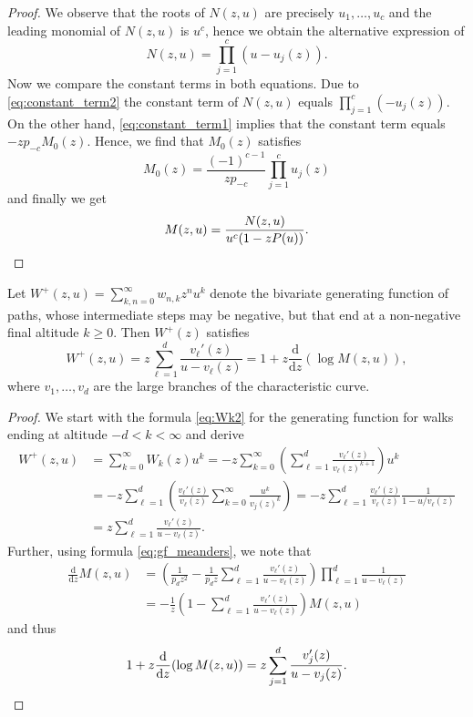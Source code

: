 \begin{proof}
  We observe that the roots of $N(z,u)$ are precisely $u_1,\dots,u_c$ and the leading monomial of $N(z,u)$ is $u^c$, hence we obtain the alternative expression of
  \begin{equation}
    \label{eq:constant_term2}
    N(z,u) =  \prod_{j=1}^c (u - u_j(z)).
  \end{equation}
  Now we compare the constant terms in both equations. 
  Due to \eqref{eq:constant_term2} the constant term of $N(z,u)$ equals $\prod_{j=1}^c (-u_j(z))$. 
  On the other hand, \eqref{eq:constant_term1} implies that the constant term equals $-zp_{-c}M_0(z)$.
  Hence, we find that $M_0(z)$ satisfies 
  $$
    M_0(z) = \frac{(-1)^{c-1}}{zp_{-c}}\prod_{j=1}^cu_j(z)
  $$
  and finally we get
  \begin{equation*}
    M(z,u) = \frac{N(z,u)}{u^c(1 - zP(u))}. \qedhere
  \end{equation*}
\end{proof}

\begin{corollary}
  Let $W^+(z,u) = \sum_{k,n = 0}^\infty w_{n,k} z^n u^k$ denote the bivariate generating function of paths, whose intermediate steps may be negative, but that end at a non-negative final altitude $k \geq 0$. Then $W^+(z)$ satisfies
  $$
    W^+(z,u) = z \sum_{\ell = 1}^d \frac{v_\ell'(z)}{u - v_\ell(z)}
    = 1 + z \frac{\mathrm{d}}{\mathrm{d}z}(\log M(z,u)),
  $$
  where $v_1, \dots, v_d$ are the large branches of the characteristic curve.
\end{corollary}

\begin{proof}
  We start with the formula \eqref{eq:Wk2} for the generating function for walks ending at altitude $-d < k < \infty$ and derive
  \begin{align*}
    W^+(z,u) &= \sum_{k = 0}^\infty W_k(z)u^k
    = -z \sum_{k = 0}^\infty 
    \left(
      \sum_{\ell = 1}^d \frac{v_\ell'(z)}{v_\ell(z)^{k+1}}
    \right)
    u^k \\
    &= -z \sum_{\ell = 1}^d 
    \left(
      \frac{v_\ell'(z)}{v_\ell(z)}
      \sum_{k = 0}^\infty \frac{u^k}{v_j(z)^k}
    \right)
    = -z \sum_{\ell = 1}^d \frac{v_\ell'(z)}{v_\ell(z)} \frac{1}{1 - u/v_\ell(z)} \\
    &= z \sum_{\ell = 1}^d \frac{v_\ell'(z)}{u - v_\ell(z)}.
  \end{align*}
  Further, using formula \eqref{eq:gf_meanders}, we note that
  \begin{align*}
    \frac{\mathrm{d}}{\mathrm{d}z} M(z,u) &= 
    \left(\frac{1}{p_d z^2} - \frac{1}{p_d z} \sum_{\ell = 1}^d \frac{v_\ell'(z)}{u - v_\ell(z)}\right) \prod_{\ell = 1}^d \frac{1}{u - v_\ell(z)} \\
    &= -\frac{1}{z}\left(1 - \sum_{\ell = 1}^d \frac{v_\ell'(z)}{u - v_\ell(z)}\right)M(z,u)
  \end{align*}
  and thus
  \begin{equation*}
    1 + z \frac{\mathrm{d}}{\mathrm{d}z}(\log M(z,u)) = z \sum_{j = 1}^d \frac{v_j'(z)}{u - v_j(z)}. \qedhere
  \end{equation*}
\end{proof}

